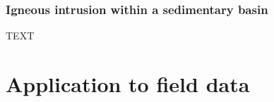 \documentclass[journal abbreviation, npg]{copernicus}
\begin{document}
%

\subsubsection*{Igneous intrusion within a sedimentary basin}

TEXT

\section{Application to field data}
\end{document}
